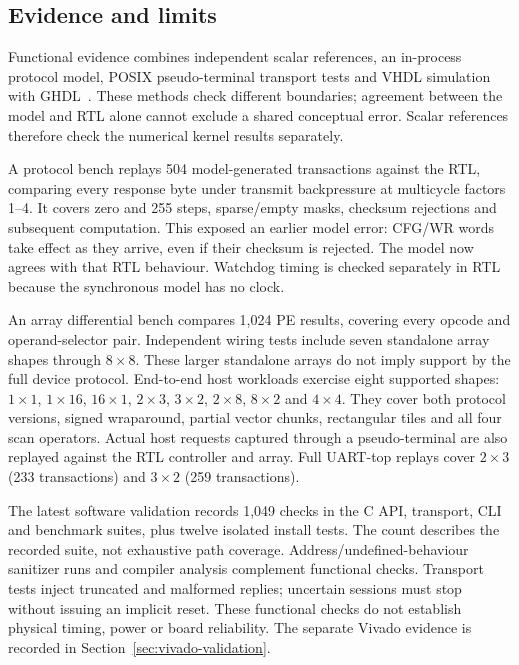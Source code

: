 \subsection{Evidence and limits}

Functional evidence combines independent scalar references, an in-process
protocol model, POSIX pseudo-terminal transport tests and VHDL simulation
with GHDL~\cite{ghdl}. These methods check different boundaries; agreement
between the model and RTL alone cannot exclude a shared conceptual error.
Scalar references therefore check the numerical kernel results separately.

A protocol bench replays 504 model-generated transactions against the RTL,
comparing every response byte under transmit backpressure at multicycle
factors 1--4. It covers zero and 255 steps, sparse/empty masks, checksum
rejections and subsequent computation. This exposed an earlier model error:
CFG/WR words take effect as they arrive, even if their checksum is rejected.
The model now agrees with that RTL behaviour. Watchdog timing is checked
separately in RTL because the synchronous model has no clock.

An array differential bench compares 1,024 PE results, covering every opcode
and operand-selector pair. Independent wiring tests include seven standalone
array shapes through $8\times8$. These larger standalone arrays do not imply
support by the full device protocol. End-to-end host workloads exercise eight
supported shapes: $1\times1$, $1\times16$, $16\times1$, $2\times3$,
$3\times2$, $2\times8$, $8\times2$ and $4\times4$.
They cover both protocol versions, signed wraparound, partial vector chunks,
rectangular tiles and all four scan operators. Actual host requests captured
through a pseudo-terminal are also replayed against the RTL controller and
array. Full UART-top replays cover $2\times3$ (233 transactions) and
$3\times2$ (259 transactions).



The latest software validation records 1,049 checks in the C API, transport,
CLI and benchmark suites, plus twelve isolated install tests. The count
describes the recorded suite, not exhaustive path coverage.
Address/undefined-behaviour sanitizer runs and compiler analysis complement
functional checks. Transport tests inject truncated and malformed replies;
uncertain sessions must stop without issuing an implicit reset. These functional checks do not establish physical timing, power or board
reliability. The separate Vivado evidence is recorded in
Section~\ref{sec:vivado-validation}.
